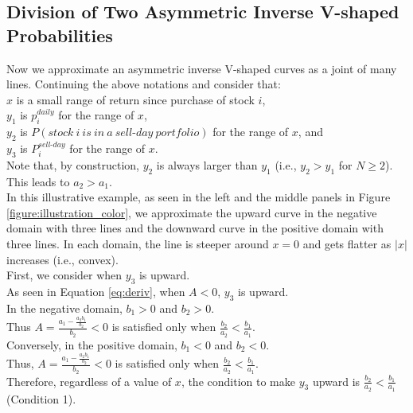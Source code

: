 \documentclass[11pt, a4paper]{article}
\begin{document}
\subsection{Division of Two Asymmetric Inverse V-shaped Probabilities}
\label{section:division_two_inverse_v}

Now we approximate an asymmetric inverse V-shaped curves as a joint of many lines. Continuing the above notations and consider that:\\
$x$ is a small range of return since purchase of stock $i$,\\
$y_1$ is $p^{daily}_{i}$ for the range of $x$,\\
$y_2$ is $P(stock~i~is~in~a~sell\mbox{-}day~portfolio)$ for the range of $x$, and \\
$y_3$ is $P^{sell\mbox{-}day}_{i}$ for the range of $x$. \\

\noindent
Note that, by construction, $y_2$ is always larger than $y_1$ (i.e., $y_2>y_1$ for $N \geq2$). This leads to $a_2>a_1$.\\

\noindent
In this illustrative example, as seen in the left and the middle panels in Figure \ref{figure:illustration_color}, we approximate the upward curve in the negative domain with three lines and the downward curve in the positive domain with three lines. In each domain, the line is steeper around $x=0$ and gets flatter as $|x|$ increases (i.e., convex).\\

\noindent
First, we consider when $y_3$ is upward.\\ 
As seen in Equation \ref{eq:deriv}, when $A<0$, $y_3$ is upward.\\

\noindent
In the negative domain, $b_1>0$ and $b_2>0$.\\
Thus $A = \frac{a_1-\frac{a_2 b_1}{b_2}}{b_2}<0$ is satisfied only when  $\frac{b_2}{a_2} < \frac{b_1}{a_1}$.\\

\noindent
Conversely, in the positive domain, $b_1<0$ and $b_2<0$.\\
Thus, $A = \frac{a_1-\frac{a_2 b_1}{b_2}}{b_2}<0$ is satisfied only when $\frac{b_2}{a_2} < \frac{b_1}{a_1}$.\\

\noindent
Therefore, regardless of a value of $x$, the condition to make $y_3$ upward is $\frac{b_2}{a_2} < \frac{b_1}{a_1}$  (Condition 1).\\
\end{document}
